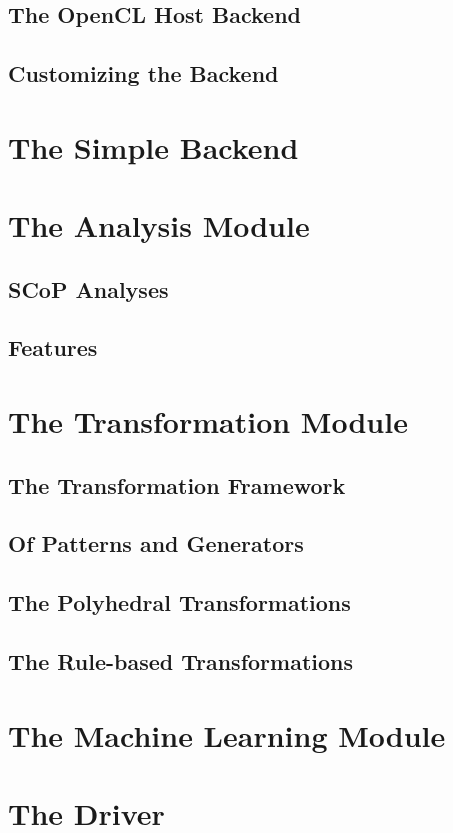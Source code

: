 \subsection{The OpenCL Host Backend}
\subsection{Customizing the Backend}

\section{The Simple Backend}

\section{The Analysis Module}
\subsection{SCoP Analyses}
\subsection{Features}

\section{The Transformation Module}
\subsection{The Transformation Framework}
\subsection{Of Patterns and Generators}
\label{sec:Compiler.Transform.Pattern}
\subsection{The Polyhedral Transformations}
\subsection{The Rule-based Transformations}

\section{The Machine Learning Module}

\section{The Driver}
